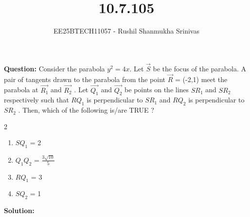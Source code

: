 \documentclass[journal]{IEEEtran}
\begin{document}


\title{10.7.105}
\author{EE25BTECH11057 - Rushil Shanmukha Srinivas
}
{\let\newpage\relax\maketitle}

\renewcommand{\thefigure}{\theenumi}
\renewcommand{\thetable}{\theenumi}
\setlength{\intextsep}{10pt} %

\renewcommand{\thetable}{\theenumi}
\textbf{Question: }
Consider the parabola $y^2 = 4x$. Let $\vec{S}$ be the focus of the parabola. A pair of tangents
drawn to the parabola from the point $\vec{R}$ = (-2,1) meet the parabola at $\vec{R_1}$ and $\vec{R_2}$ .
Let $\vec{Q_1}$ and $\vec{Q_2}$ be points on the lines $S{R_1}$ and $S{R_2}$ respectively such that $RQ_1$ is
perpendicular to $SR_1$ and $RQ_2$ is perpendicular to $SR_2$ . Then, which of the following
is/are TRUE ?
\begin{multicols}{2}
\begin{enumerate}
\item $SQ_1$ = 2
\item $Q_1Q_2$ = $\frac{3\sqrt{10}}{5}$
\item $RQ_1$ = 3
\item $SQ_2$ = 1
\end{enumerate}
\end{multicols}
\textbf{Solution: }
\begin{table}[h!]
  \centering
  
  \caption*{Table : Conics}
  \label{10.7.105}
\end{table}
\end{document}
